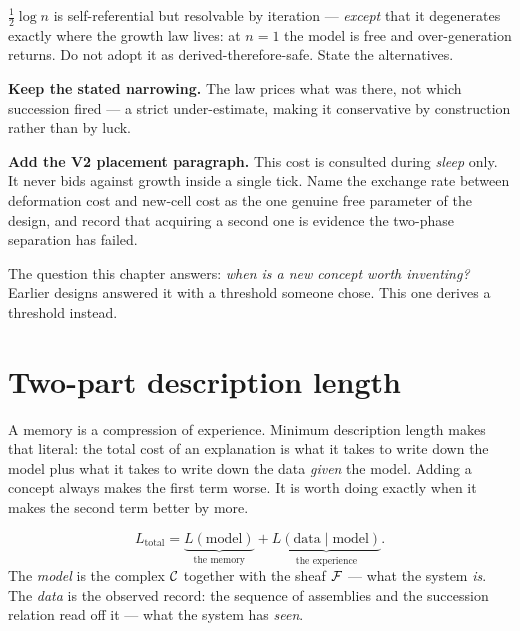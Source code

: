 \begin{workplan}{\Recast}
{    $\tfrac12\log n$ is self-referential but resolvable by iteration ---
    \emph{except} that it degenerates exactly where the growth law lives: at
    $n = 1$ the model is free and over-generation returns. Do not adopt it as
    derived-therefore-safe. State the alternatives.
  \item \textbf{Keep the stated narrowing.} The law prices what was there, not
    which succession fired --- a strict under-estimate, making it conservative
    by construction rather than by luck.
  \item \textbf{Add the V2 placement paragraph.} This cost is consulted during
    \emph{sleep} only. It never bids against growth inside a single tick.
    Name the exchange rate between deformation cost and new-cell cost as the
    one genuine free parameter of the design, and record that acquiring a
    second one is evidence the two-phase separation has failed.
}

\end{workplan}

The question this chapter answers: \emph{when is a new concept worth
inventing?} Earlier designs answered it with a threshold someone chose.
This one derives a threshold instead.

\section{Two-part description length}

\begin{intu}\Intu
A memory is a compression of experience. Minimum description length
makes that literal: the total cost of an explanation is what it takes to
write down the model plus what it takes to write down the data
\emph{given} the model. Adding a concept always makes the first term
worse. It is worth doing exactly when it makes the second term better by
more.
\end{intu}

\begin{definition}\label{def:mdl}
\[
  L_{\text{total}}
  =\underbrace{L(\text{model})}_{\text{the memory}}
  +\underbrace{L(\text{data}\mid\text{model})}_{\text{the experience}} .
\]
The \emph{model} is the complex $\mathcal{C}$ together with the sheaf $\mathcal{F}$ ---
what the system \emph{is}. The \emph{data} is the observed record: the
sequence of assemblies and the succession relation read off it --- what
the system has \emph{seen}.
\end{definition}

